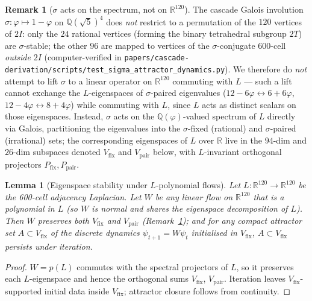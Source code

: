 \documentclass[11pt, a4paper]{amsart}
\newtheorem{lemma}[theorem]{Lemma}
\theoremstyle{definition}
\newtheorem{remark}[theorem]{Remark}
\newcommand{\R}{\mathbb{R}}
\newcommand{\Q}{\mathbb{Q}}
\begin{document}
\begin{remark}[$\sigma$ acts on the spectrum, not on $\R^{120}$]\label{rmk:sigma_on_R120}
The cascade Galois involution $\sigma: \varphi \mapsto 1 - \varphi$
on $\Q(\sqrt 5)^4$ does \emph{not} restrict to a permutation of the
$120$ vertices of $2I$: only the $24$ rational vertices (forming
the binary tetrahedral subgroup $2T$) are $\sigma$-stable; the
other $96$ are mapped to vertices of the $\sigma$-conjugate
$600$-cell \emph{outside} $2I$ (computer-verified in
\texttt{papers/cascade-derivation/scripts/test\_sigma\_attractor\_dynamics.py}).
We therefore do \emph{not} attempt to lift $\sigma$ to a linear
operator on $\R^{120}$ commuting with $L$ — such a lift cannot
exchange the $L$-eigenspaces of $\sigma$-paired eigenvalues
($12{-}6\varphi \leftrightarrow 6{+}6\varphi$,
$12{-}4\varphi \leftrightarrow 8{+}4\varphi$) while commuting with
$L$, since $L$ acts as distinct scalars on those eigenspaces.
Instead, $\sigma$ acts on the $\Q(\varphi)$-valued spectrum of $L$
directly via Galois, partitioning the eigenvalues into the
$\sigma$-fixed (rational) and $\sigma$-paired (irrational) sets;
the corresponding eigenspaces of $L$ over $\R$ live in the
$94$-dim and $26$-dim subspaces denoted $V_{\mathrm{fix}}$ and
$V_{\mathrm{pair}}$ below, with $L$-invariant orthogonal projectors
$P_{\mathrm{fix}}, P_{\mathrm{pair}}$.
\end{remark}

\begin{lemma}[Eigenspace stability under $L$-polynomial flows]\label{lem:sigma_attractor_stable}
Let $L: \R^{120} \to \R^{120}$ be the 600-cell adjacency Laplacian.
Let $W$ be any linear flow on $\R^{120}$ that is a polynomial in
$L$ (so $W$ is normal and shares the eigenspace decomposition of
$L$).  Then $W$ preserves both $V_{\mathrm{fix}}$ and
$V_{\mathrm{pair}}$ (Remark~\ref{rmk:sigma_on_R120}); and for any
compact attractor set $A \subset V_{\mathrm{fix}}$ of the discrete
dynamics $\psi_{t+1} = W \psi_t$ initialised in $V_{\mathrm{fix}}$,
$A \subset V_{\mathrm{fix}}$ persists under iteration.
\end{lemma}

\begin{proof}
$W = p(L)$ commutes with the spectral projectors of $L$, so it
preserves each $L$-eigenspace and hence the orthogonal sums
$V_{\mathrm{fix}}$, $V_{\mathrm{pair}}$.  Iteration leaves
$V_{\mathrm{fix}}$-supported initial data inside $V_{\mathrm{fix}}$;
attractor closure follows from continuity.
\end{proof}
\end{document}
